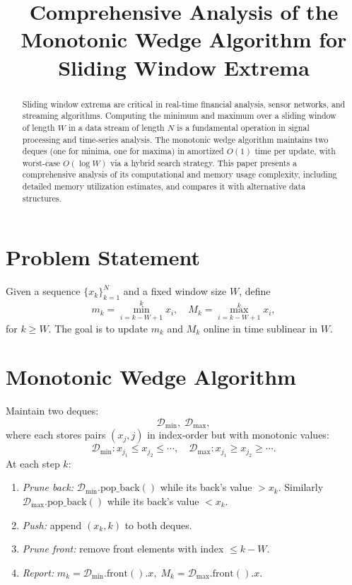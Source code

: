 \documentclass[12pt]{article}
\title{Comprehensive Analysis of the Monotonic Wedge Algorithm for Sliding Window Extrema}
\date{}
\begin{document}
\maketitle

\begin{abstract}
Sliding window extrema are critical in real-time financial analysis, sensor networks, and streaming algorithms. Computing the minimum and maximum over a sliding window of length \(W\) in a data stream of length \(N\) is a fundamental operation in signal processing and time-series analysis.  The monotonic wedge algorithm maintains two deques (one for minima, one for maxima) in amortized \(O(1)\) time per update, with worst-case \(O(\log W)\) via a hybrid search strategy.  This paper presents a comprehensive analysis of its computational and memory usage complexity, including detailed memory utilization estimates, and compares it with alternative data structures.
\end{abstract}

\section{Problem Statement}
Given a sequence \(\{x_k\}_{k=1}^N\) and a fixed window size \(W\), define
\[
m_k = \min_{i=k-W+1}^k x_i,
\quad
M_k = \max_{i=k-W+1}^k x_i,
\]
for \(k\ge W\).  The goal is to update \(m_k\) and \(M_k\) online in time sublinear in \(W\).

\section{Monotonic Wedge Algorithm}
Maintain two deques:
\[
\mathcal{D}_{\min},\;\mathcal{D}_{\max},
\]
where each stores pairs \((x_j,j)\) in index‐order but with monotonic values:
\[
\mathcal{D}_{\min}: x_{j_1}\le x_{j_2}\le\cdots,
\quad
\mathcal{D}_{\max}: x_{j_1}\ge x_{j_2}\ge\cdots.
\]
At each step \(k\):
\begin{enumerate}
  \item \emph{Prune back:}
    \(\mathcal{D}_{\min}.\mathrm{pop\_back}()\) while its back’s value \(>x_k\).
    Similarly \(\mathcal{D}_{\max}.\mathrm{pop\_back}()\) while its back’s value \(<x_k\).
  \item \emph{Push:} append \((x_k,k)\) to both deques.
  \item \emph{Prune front:} remove front elements with index \(\le k-W\).
  \item \emph{Report:}  
    \(m_k=\mathcal{D}_{\min}.\mathrm{front}().x,\;M_k=\mathcal{D}_{\max}.\mathrm{front}().x.\)
\end{enumerate}
\end{document}
